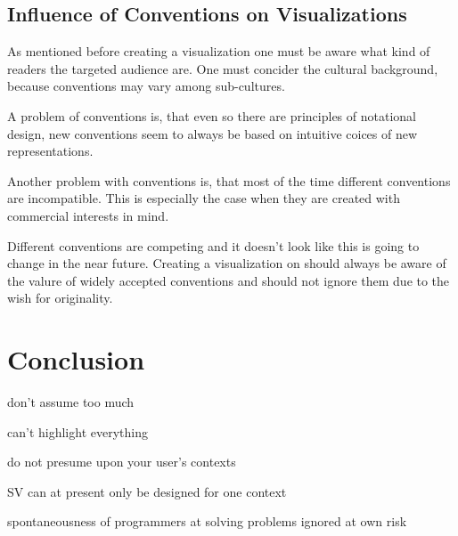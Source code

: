 \documentclass[11pt, a4paper, ngerman, twoside]{article}
\theoremstyle{plain}\newtheorem{Lemma}{Lemma}
\theoremstyle{plain}\newtheorem{Satz}[Lemma]{Satz}
\theoremstyle{definition}\newtheorem{Definition}[Lemma]{Definition}
\theoremstyle{definition}\newtheorem*{Beispiel}{Beispiel}
\theoremstyle{remark}\newtheorem*{Bemerkung}{Bemerkung}
\begin{document}
\subsection{Influence of Conventions on Visualizations}

As mentioned before creating a visualization one must be aware what kind of readers the targeted audience are. One must concider the cultural background, because conventions may vary among sub-cultures.

A problem of conventions is, that even so there are principles of notational design, new conventions seem to always be based on intuitive coices of new representations\cite{ro}.

Another problem with conventions is, that most of the time different conventions are incompatible. This is especially the case when they are created with commercial interests in mind.

Different conventions are competing and it doesn't look like this is going to change in the near future. Creating a visualization on should always be aware of the valure of widely accepted conventions and should not ignore them due to the wish for originality.

\section{Conclusion}

don’t assume too much

can’t highlight everything

do not presume upon your user’s contexts

SV can at present only be designed for one context

spontaneousness of programmers at solving problems ignored at own risk



\end{document}
